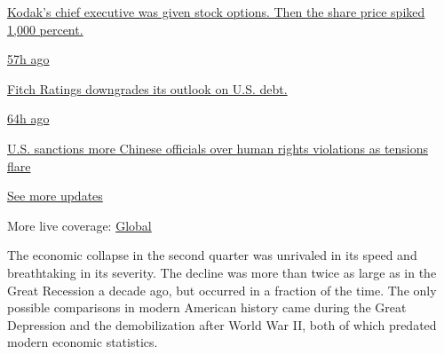 \href{https://www.nytimes.com/live/2020/07/31/business/stock-market-today-coronavirus?action=click\&pgtype=Article\&state=default\&region=MAIN_CONTENT_1\&context=storylines_live_updates\#kodaks-chief-executive-was-given-stock-options-then-the-share-price-spiked-1000-percent}{Kodak's
chief executive was given stock options. Then the share price spiked
1,000 percent.}

\href{https://www.nytimes.com/live/2020/07/31/business/stock-market-today-coronavirus?action=click\&pgtype=Article\&state=default\&region=MAIN_CONTENT_1\&context=storylines_live_updates\#fitch-ratings-downgrades-its-outlook-on-us-debt}{57h
ago}

\href{https://www.nytimes.com/live/2020/07/31/business/stock-market-today-coronavirus?action=click\&pgtype=Article\&state=default\&region=MAIN_CONTENT_1\&context=storylines_live_updates\#fitch-ratings-downgrades-its-outlook-on-us-debt}{Fitch
Ratings downgrades its outlook on U.S. debt.}

\href{https://www.nytimes.com/live/2020/07/31/business/stock-market-today-coronavirus?action=click\&pgtype=Article\&state=default\&region=MAIN_CONTENT_1\&context=storylines_live_updates\#us-sanctions-more-chinese-officials-over-human-rights-violations-as-tensions-flare}{64h
ago}

\href{https://www.nytimes.com/live/2020/07/31/business/stock-market-today-coronavirus?action=click\&pgtype=Article\&state=default\&region=MAIN_CONTENT_1\&context=storylines_live_updates\#us-sanctions-more-chinese-officials-over-human-rights-violations-as-tensions-flare}{U.S.
sanctions more Chinese officials over human rights violations as
tensions flare}

\href{https://www.nytimes.com/live/2020/07/31/business/stock-market-today-coronavirus?action=click\&pgtype=Article\&state=default\&region=MAIN_CONTENT_1\&context=storylines_live_updates}{See
more updates}

More live coverage:
\href{https://www.nytimes.com/2020/08/01/world/coronavirus-covid-19.html?action=click\&pgtype=Article\&state=default\&region=MAIN_CONTENT_1\&context=storylines_live_updates}{Global}

The economic collapse in the second quarter was unrivaled in its speed
and breathtaking in its severity. The decline was more than twice as
large as in the Great Recession a decade ago, but occurred in a fraction
of the time. The only possible comparisons in modern American history
came during the Great Depression and the demobilization after World War
II, both of which predated modern economic statistics.

